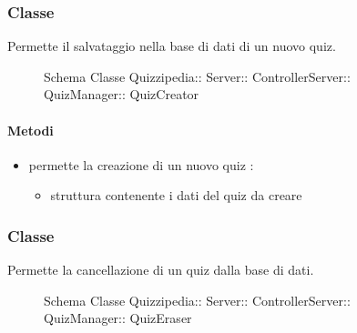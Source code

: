 \subsubsection{Classe }
Permette il salvataggio nella base di dati di un nuovo quiz.
\begin{figure}[H]
\centering
\noindent{}
\caption[Schema Classe QuizCreator]{Schema Classe Quizzipedia:: Server:: ControllerServer:: QuizManager:: QuizCreator}
\end{figure}
\paragraph{Metodi}
\begin{itemize}
\item {}
\newline
permette la creazione di un nuovo quiz
\newline
{} :
\begin{itemize}
\item {}
\newline
struttura contenente i dati del quiz da creare
\end{itemize}
\end{itemize}
\subsubsection{Classe }
Permette la cancellazione di un quiz dalla base di dati.
\begin{figure}[H]
\centering
\noindent{}
\caption[Schema Classe QuizEraser]{Schema Classe Quizzipedia:: Server:: ControllerServer:: QuizManager:: QuizEraser}
\end{figure}
